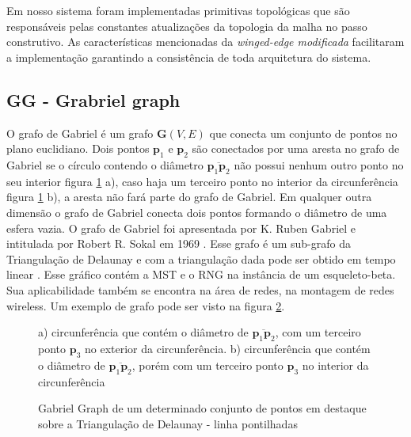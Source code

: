 \documentclass[12pt,a4paper]{book}
\begin{document}
Em nosso sistema foram implementadas primitivas topol\'ogicas que s\~ao respons\'aveis pelas constantes atualiza\c{c}\~{o}es da topologia da malha no passo construtivo. As caracter\'isticas mencionadas da \textit{winged-edge modificada} facilitaram a implementa\c{c}\~{a}o garantindo a consist\^encia de toda arquitetura do sistema.



\subsection{GG - Grabriel graph}

O grafo de Gabriel \'e um grafo ${\mathbf G}(V, E)$ que conecta um conjunto de pontos no plano euclidiano. Dois pontos $\mathbf{p}_1$ e $\mathbf{p}_2$ s\~ao conectados por uma aresta no grafo de Gabriel se o c\'irculo contendo o di\^ametro $\overline{{\mathbf p}_1{\mathbf p}_2}$ n\~ao possui nenhum outro ponto no seu interior figura \ref{fig_gabriel_circ} a), caso haja um terceiro ponto no interior da circunfer\^encia figura \ref{fig_gabriel_circ} b), a aresta n\~ao far\'a parte do grafo de Gabriel. Em qualquer outra dimens\~ao o grafo de Gabriel conecta dois pontos formando o di\^ametro de uma esfera vazia. O grafo de Gabriel foi apresentada por K. Ruben Gabriel e intitulada  por  Robert R. Sokal em 1969 \cite{sokal}. Esse grafo \'e um sub-grafo da Triangula\c{c}\~{a}o de Delaunay e com a triangula\c{c}\~{a}o dada pode ser obtido em tempo linear \cite{matula}. Esse gr\'afico cont\'em a MST e o RNG na inst\^ancia de um esqueleto-beta. Sua aplicabilidade tamb\'em se encontra na \'area de redes, na montagem de redes wireless. Um exemplo de grafo pode ser visto na figura \ref{fig_gabriel_graph}.


\begin{figure}[htbp]
  \begin{center}
    \leavevmode
    
    \caption{a) circunfer\^encia que cont\'em o di\^ametro de $\overline{{\mathbf p}_1{\mathbf p}_2}$, com um terceiro ponto ${\mathbf p}_3$ no exterior da circunfer\^encia. b) circunfer\^encia que cont\'em o di\^ametro de $\overline{{\mathbf p}_1{\mathbf p}_2}$, por\'em com um terceiro ponto ${\mathbf p}_3$ no interior da circunfer\^encia}
    \label{fig_gabriel_circ}
  \end{center}
\end{figure}


\begin{figure}[htbp]
  \begin{center}
    \leavevmode
    
    \caption{Gabriel Graph de um determinado conjunto de pontos em destaque sobre a Triangula\c{c}\~{a}o de Delaunay - linha pontilhadas}
    \label{fig_gabriel_graph}
  \end{center}
\end{figure}
\end{document}
